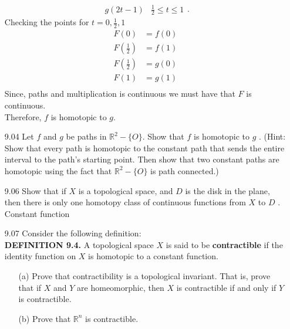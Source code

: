 \documentclass[12pt]{article}
\begin{document}
\begin{enumerate}
\[\begin{array}{ll}
			{g(2t-1)} & {\frac{1}{2} \leq t \leq 1 }
		\end{array}.\]
		Checking the points for $ t=0,\frac{1}{2},1 $
		\begin{align*}
			F(0) &= f(0) \\
			F(\frac{1}{2}) &= f(1)\\
			F(\frac{1}{2}) &= g(0)\\
			F(1) &= g(1)\\
		\end{align*}
		Since, paths and multiplication is continuous we must have that $ F $ is continuous.\\
		Therefore, $f$ is homotopic to $g .$ 
		\item[9.04] Let $f$ and $g$ be paths in $\mathbb { R } ^ { 2 } - \{ O \} .$ Show that $f$ is homotopic to $g$ . (Hint: Show
		that every path is homotopic to the constant path that sends the entire interval
		to the path's starting point. Then show that two constant paths are homotopic
		using the fact that $\mathbb { R } ^ { 2 } - \{ O \}$ is path connected.)
		
		\item[9.06] Show that if $X$ is a topological space, and $D$ is the disk in the plane, then there is only one homotopy class of continuous functions from $X$ to $D$ .
		Constant function
		\item[9.07] Consider the following definition:\medskip\\
		\textbf{DEFINITION 9.4.} A topological space $X$ is said to be \textbf{contractible} if the
		identity function on $X$ is homotopic to a constant function.
		
		\begin{enumerate}
			\item[(a)] Prove that contractibility is a topological invariant. That is, prove that if
			$X$ and $Y$ are homeomorphic, then $X$ is contractible if and only if $Y$ is
			contractible.
			
			\item[(b)] Prove that $\mathbb { R } ^ { n }$ is contractible.
			

\end{enumerate}
\end{enumerate}
\end{document}
